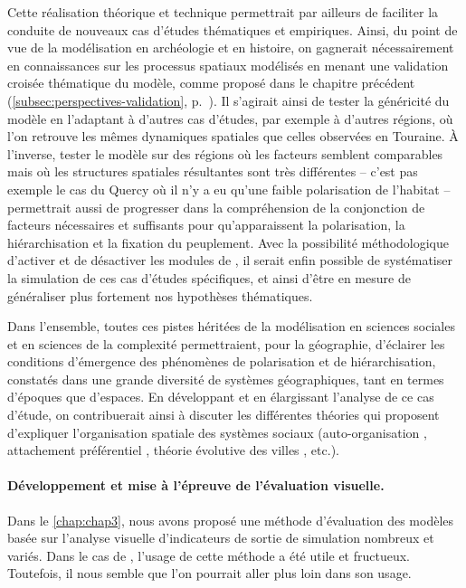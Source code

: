 Cette réalisation théorique et technique permettrait par ailleurs de faciliter la conduite de nouveaux cas d'études thématiques et empiriques.
Ainsi, du point de vue de la modélisation en archéologie et en histoire, on gagnerait nécessairement en connaissances sur les processus spatiaux modélisés en menant une \og validation croisée\fg{} thématique du modèle, comme proposé dans le chapitre précédent (\cref{subsec:perspectives-validation}, p.~\pageref{par:validation-croisee}).
Il s'agirait ainsi de tester la généricité du modèle en l'adaptant à d'autres cas d'études, par exemple à d'autres régions, où l'on retrouve les mêmes dynamiques spatiales que celles observées en Touraine.
À l'inverse, tester le modèle sur des régions où les facteurs semblent comparables mais où les structures spatiales résultantes sont très différentes -- c'est pas exemple le cas du Quercy où il n'y a eu qu'une faible polarisation de l'habitat -- permettrait aussi de progresser dans la compréhension de la conjonction de facteurs nécessaires et suffisants pour qu'apparaissent la polarisation, la hiérarchisation et la fixation du peuplement.
Avec la possibilité méthodologique d'activer et de désactiver les \og modules\fg{} de \simfeodal{}, il serait enfin possible de systématiser la simulation de ces cas d'études spécifiques, et ainsi d'être en mesure de généraliser plus fortement nos hypothèses thématiques.

Dans l'ensemble, toutes ces pistes héritées de la modélisation en sciences sociales et en sciences de la complexité permettraient, pour la géographie, d'éclairer les conditions d'émergence des phénomènes de polarisation et de hiérarchisation, constatés dans une grande diversité de systèmes géographiques, tant en termes d'époques que d'espaces.
En développant et en élargissant l'analyse de ce cas d'étude, on contribuerait ainsi à discuter les différentes théories qui proposent d'expliquer l'organisation spatiale des systèmes sociaux (auto-organisation \autocite{saint1989villes}, attachement préférentiel \autocite{albert_statistical_2002}, théorie évolutive des villes \autocite{pumain_pour_1997}, etc.).

\paragraph{Développement et mise à l'épreuve de l'évaluation visuelle.}
Dans le \cref{chap:chap3}, nous avons proposé une méthode d'évaluation des modèles basée sur l'analyse visuelle d'indicateurs de sortie de simulation nombreux et variés.
Dans le cas de \simfeodal{}, l'usage de cette méthode a été utile et fructueux.
Toutefois, il nous semble que l'on pourrait aller plus loin dans son usage.

